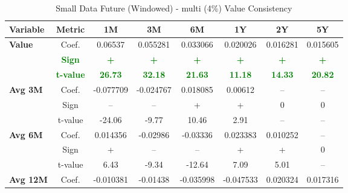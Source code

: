 \documentclass[11pt,english,a4paper,hidelinks]{book}
\begin{document}
\begin{table}[H]
    \centering
    \caption{Small Data Future (Windowed) - \acrshort{multi} (4\%) Value Consistency}
    \begin{tabular}{lccccccc}
        \toprule
        \textbf{Variable} & \textbf{Metric} & \textbf{1M} & \textbf{3M} & \textbf{6M} & \textbf{1Y} & \textbf{2Y} & \textbf{5Y} \\
        \midrule
        \multirow{3}{*}{\textbf{Value}}
            & Coef.   & 0.06537  & 0.055281 & 0.033066 & 0.020026 & 0.016281 & 0.015605 \\
            & \textbf{\textcolor{green}{Sign}}
                     & \textbf{\textcolor{green}{+}}
                     & \textbf{\textcolor{green}{+}}
                     & \textbf{\textcolor{green}{+}}
                     & \textbf{\textcolor{green}{+}}
                     & \textbf{\textcolor{green}{+}}
                     & \textbf{\textcolor{green}{+}} \\
            & \textbf{\textcolor{green}{t-value}}
                     & \textbf{\textcolor{green}{26.73}}
                     & \textbf{\textcolor{green}{32.18}}
                     & \textbf{\textcolor{green}{21.63}}
                     & \textbf{\textcolor{green}{11.18}}
                     & \textbf{\textcolor{green}{14.33}}
                     & \textbf{\textcolor{green}{20.82}} \\
        \cmidrule{1-8}
        \multirow{3}{*}{\textbf{Avg 3M}}
            & Coef.   & -0.077709 & -0.024767 & 0.018085  & 0.00612   & --        & --        \\
            & Sign    & –         & –         & +         & +         & 0         & 0         \\
            & t-value & -24.06    & -9.77     & 10.46     & 2.91      & --        & --        \\
        \cmidrule{1-8}
        \multirow{3}{*}{\textbf{Avg 6M}}
            & Coef.   & 0.014356  & -0.02986  & -0.03336  & 0.023383  & 0.010252  & --        \\
            & Sign    & +         & –         & –         & +         & +         & 0         \\
            & t-value & 6.43      & -9.34     & -12.64    & 7.09      & 5.01      & --        \\
        \cmidrule{1-8}
        \multirow{3}{*}{\textbf{Avg 12M}}
            & Coef.   & -0.010381 & -0.01438  & -0.035998 & -0.047533 & 0.020324  & 0.017316  \\

\end{tabular}
\end{table}
\end{document}
